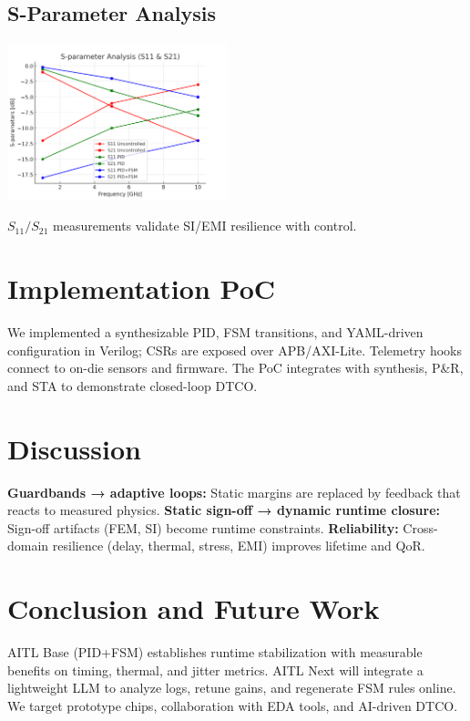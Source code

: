\documentclass[conference]{IEEEtran}
\begin{document}
\subsection{S-Parameter Analysis}
\includegraphics[width=0.48\textwidth]{figs/sparam_s11s21.png}
\caption{$S_{11}/S_{21}$ measurements validate SI/EMI resilience with control.}

\section{Implementation PoC}
We implemented a synthesizable PID, FSM transitions, and YAML-driven configuration in Verilog; CSRs are exposed over APB/AXI-Lite. Telemetry hooks connect to on-die sensors and firmware. The PoC integrates with synthesis, P\&R, and STA to demonstrate closed-loop DTCO.

\section{Discussion}
\textbf{Guardbands → adaptive loops:} Static margins are replaced by feedback that reacts to measured physics.  
\textbf{Static sign-off → dynamic runtime closure:} Sign-off artifacts (FEM, SI) become runtime constraints.  
\textbf{Reliability:} Cross-domain resilience (delay, thermal, stress, EMI) improves lifetime and QoR.

\section{Conclusion and Future Work}
AITL Base (PID+FSM) establishes runtime stabilization with measurable benefits on timing, thermal, and jitter metrics. AITL Next will integrate a lightweight LLM to analyze logs, retune gains, and regenerate FSM rules online. We target prototype chips, collaboration with EDA tools, and AI-driven DTCO.




\end{document}
